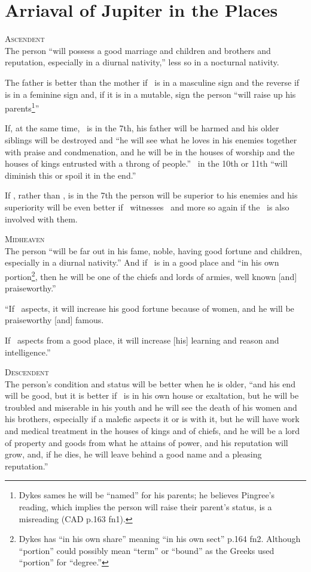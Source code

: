\section{Arriaval of Jupiter in the Places}
\textsc{Ascendent} \hfill \\
\indent The person ``will possess a good marriage and children and brothers and reputation, especially in a diurnal nativity,'' less so in a nocturnal nativity.

The father is better than the mother if \Jupiter\, is in a masculine sign and the reverse if \Jupiter\, is in a feminine sign and, if it is in a mutable, sign the person ``will raise up his parents\footnote{Dykes sames he will be ``named'' for his parents; he believes Pingree's reading, which implies the person will raise their parent's status, is a misreading (CAD p.163 fn1).}''

If, at the same time, \Saturn\, is in the 7th, his father will be harmed and his older siblings will be destroyed and ``he will see what he loves in his enemies together with praise and condmenation, and he will be in the houses of worship and the houses of kings entrusted with a throng of people.'' \Mars\, in the 10th or 11th ``will diminish this or spoil it in the end.''

If \Mars, rather than \Saturn, is in the 7th the person will be superior to his enemies and his superiority will be even better if \Venus\, witnesses \Jupiter\, and more so again if the \Moon\, is also involved with them.

\vspace{0.5em}
\noindent\textsc{Midheaven} \hfill \\
\indent The person ``will be far out in his fame, noble, having good fortune and children, especially in a diurnal nativity.'' And if \Mars\, is in a good place and ``in his own portion\footnote{Dykes has ``in his own share'' meaning ``in his own sect'' p.164 fn2. Although ``portion'' could possibly mean ``term'' or ``bound'' as the Greeks used ``portion'' for ``degree.''}, then he will be one of the chiefs and lords of armies, well known [and] praiseworthy.''

``If \Venus\, aspects, it will increase his good fortune because of women, and he will be praiseworthy [and] famous.

If \Mercury\, aspects from a good place, it will increase [his] learning and reason and intelligence.''

\vspace{0.5em}
\noindent\textsc{Descendent} \hfill \\
\indent The person's condition and status will be better when he is older, ``and his end will be good, but it is better if \Jupiter\, is in his own house or exaltation, but he will be troubled and miserable in his youth and he will see the death of his women and his brothers, especially if a malefic aspects it or is with it, but he will have work and medical treatment in the houses of kings and of chiefs, and he will be a lord of property and goods from what he attains of power, and his reputation will grow, and, if he dies, he will leave behind a good name and a pleasing reputation.''

